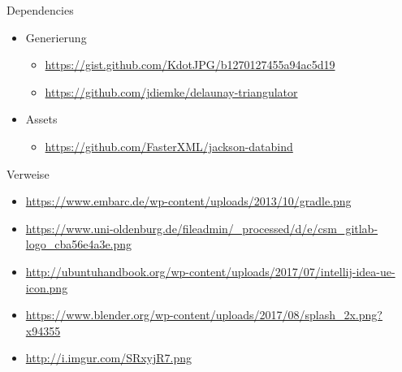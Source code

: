 \documentclass[10pt]{beamer}
\begin{document}
\begin{frame}{Dependencies}
\begin{itemize}
    \item Generierung
    \begin{itemize}
        \item \url{https://gist.github.com/KdotJPG/b1270127455a94ac5d19}
        \item \url{https://github.com/jdiemke/delaunay-triangulator}
    \end{itemize}
    
    \item Assets
    \begin{itemize}
        \item \url{https://github.com/FasterXML/jackson-databind}
    \end{itemize}
\end{itemize}
    
\end{frame}

\begin{frame}{Verweise}
    \begin{itemize}
        \item \url{https://www.embarc.de/wp-content/uploads/2013/10/gradle.png}
        \item \url{https://www.uni-oldenburg.de/fileadmin/_processed/d/e/csm_gitlab-logo_cba56e4a3e.png}
        \item \url{http://ubuntuhandbook.org/wp-content/uploads/2017/07/intellij-idea-ue-icon.png}
        \item \url{https://www.blender.org/wp-content/uploads/2017/08/splash_2x.png?x94355}
        \item \url{http://i.imgur.com/SRxyjR7.png}
    \end{itemize}
\end{frame}

\end{document}
